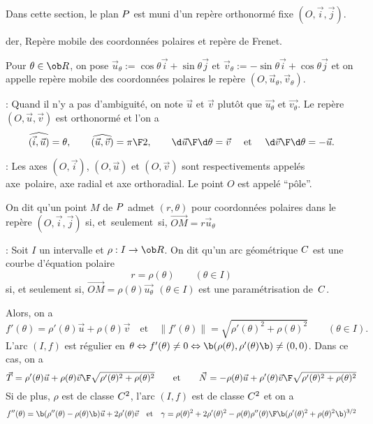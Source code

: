 \noindent
Dans cette section, le plan $\sc P$ est muni d'un repère orthonormé fixe
$(O,\vec i,\vec j)$. 
\bigskip

\Subsection der, Repère mobile des coordonnées polaires et repère de Frenet. 
\bigskip

\Definition Pour $\theta\in\ob R$, on pose $\vec u_\theta:=\cos\theta\vec i+\sin\theta\vec j$ et 
$\vec v_\theta:=-\sin\theta\vec i+\cos\theta\vec j$ et on appelle repère mobile 
des coordonnées polaires le repère $(O, \vec u_\theta,\vec v_\theta)$. 
\bigskip

\Remarque : Quand il n'y a pas d'ambiguité, on note $\vec u$ et $\vec v$ plutôt 
que $\vec{u_\theta}$ et $\vec{v _\theta}$. \pn
Le repère $(O,\vec u,\vec v)$ est orthonormé et l'on a 
$$
\widehat{(\vec i,\vec u)}=\theta,\qquad \widehat{(\vec u,\vec v)}={\pi\F2}, \qquad {\d \vec u\F\d\theta}=\vec v
\quad\mbox{ et }
\quad{\d \vec v\F\d\theta}=-\vec u. 
$$

\Remarque : Les axes $(O,\vec i)$, $(O,\vec u)$ et $(O,\vec v)$ sont respectivements 
appelés axe~polaire, axe radial et axe orthoradial. 
Le point $O$ est appelé ``pôle''. 
\bigskip

\Definition On dit qu'un point $M$ de $\sc P$ 
admet $(r,\theta)$ pour coordonnées polaires dans le repère $(O, \vec i,\vec j)$ si, 
et~seulement~si, $\vec {OM}=r\vec u_{\theta}$
\bigskip

\Remarque : Soit $I$ un intervalle et $\rho:I\to\ob R$. 
On dit qu'un arc géométrique $\sc C$ est une courbe d'équation polaire 
$$
r=\rho(\theta)\qquad(\theta\in I)
$$
si, et seulement si, $\vec{OM}=\rho(\theta)\vec{u_\theta}\ \,(\theta\in I)$ 
est une paramétrisation de~$\sc C$. 
\bigskip

Alors, on a 
$$
f'(\theta)=\rho'(\theta)\vec u+\rho(\theta)\vec v \quad\mbox{et}\quad \|f'(\theta)\|=\sqrt{\rho'(\theta)^2+\rho(\theta)^2}
\qquad(\theta\in I).
$$ 
L'arc $(I,f)$ est régulier en 
$\theta \Leftrightarrow f'(\theta)\neq 0 \Leftrightarrow \b(\rho(\theta),\rho'(\theta)\b)
\neq (0,0)$. Dans ce cas, on a 
$$
\vec T={\rho'(\theta)\vec u+\rho(\theta)\vec v\F\sqrt{\rho'(\theta)^2+\rho(\theta)^2}}
\qquad\mbox{et}\qquad \vec N={-\rho(\theta)\vec u+\rho'(\theta)\vec v\F\sqrt{\rho'(\theta)^2+\rho(\theta)^2}}
$$ 
Si de plus, $\rho$ est de classe $\sc C^2$, l'arc $(I,f)$ est de classe $\sc C^2$ et on a 
$$
f''(\theta)=\b(\rho''(\theta)-\rho(\theta)\b)\vec u+2\rho'(\theta)\vec v \quad\mbox{et}\quad 
\gamma={\rho(\theta)^2+2\rho'(\theta)^2-\rho(\theta)\rho''(\theta)\F\b(\rho'(\theta)^2+\rho(\theta)^2\b)^{3/2}}
$$

